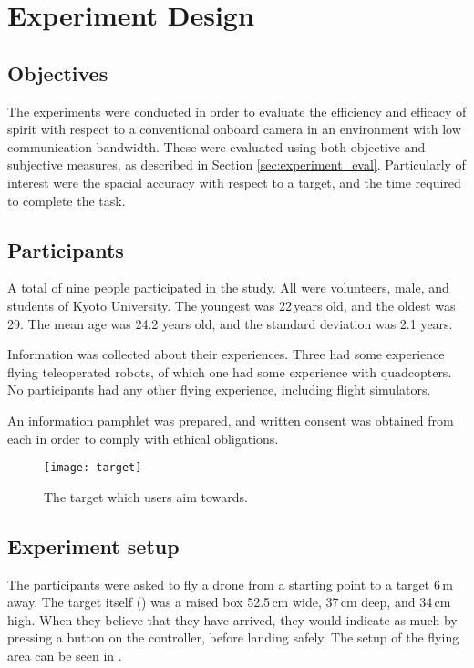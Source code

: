 \chapter{Experiment Design}

\section{Objectives}
  The experiments were conducted in order to evaluate the efficiency and efficacy of \gls{spirit} with respect to a conventional onboard camera in an environment with low communication bandwidth.
  These were evaluated using both objective and subjective measures, as described in Section \ref{sec:experiment_eval}.
  Particularly of interest were the spacial accuracy with respect to a target, and the time required to complete the task.

\section{Participants}
A total of nine people participated in the study.
All were volunteers, male, and students of Kyoto University.
The youngest was 22\,years old, and the oldest was 29.
The mean age was 24.2 years old, and the standard deviation was 2.1 years.

Information was collected about their experiences.
Three had some experience flying teleoperated robots, of which one had some experience with quadcopters.
No participants had any other flying experience, including flight simulators.

An information pamphlet was prepared, and written consent was obtained from each in order to comply with ethical obligations.

\begin{wrapfigure}{r}{0.47\textwidth}
  \centering
  \texttt{[image: target]}
  \caption[Target]{
    The target which users aim towards.
  }
  \label{fig:target}
\end{wrapfigure}

\section{Experiment setup}
The participants were asked to fly a drone from a starting point to a target 6\,m away.
The target itself () was a raised box 52.5\,cm wide, 37\,cm deep, and 34\,cm high.
When they believe that they have arrived, they would indicate as much by pressing a button on the controller, before landing safely.
The setup of the flying area can be seen in .

